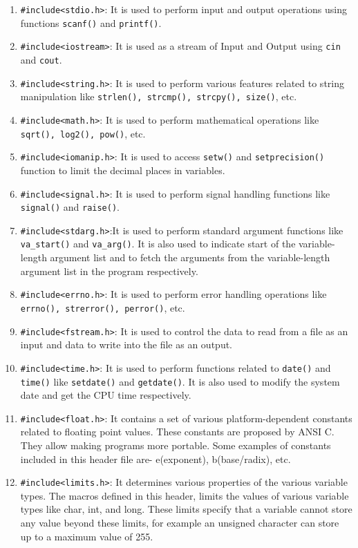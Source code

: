 \documentclass{book}
\begin{document}
\begin{enumerate}
	\item \texttt{#include<stdio.h>}: It is used to perform input and output operations using functions \texttt{scanf()} and \texttt{printf()}.
\item \texttt{#include<iostream>}: It is used as a stream of Input and Output using \texttt{cin} and \texttt{cout}.
\item \texttt{#include<string.h>}: It is used to perform various features related to string manipulation like \texttt{strlen(), strcmp(), strcpy(), size()}, etc.
\item \texttt{#include<math.h>}: It is used to perform mathematical operations like \texttt{sqrt(), log2(), pow()}, etc.
\item \texttt{#include<iomanip.h>}: It is used to access \texttt{setw()} and \texttt{setprecision()} function to limit the decimal places in variables.
\item \texttt{#include<signal.h>}: It is used to perform signal handling functions like \texttt{signal()} and \texttt{raise()}.
\item \texttt{#include<stdarg.h>}:It is used to perform standard argument functions like \texttt{va\_start()} and \texttt{va\_arg()}. It is also used to indicate start of the variable-length argument list and to fetch the arguments from the variable-length argument list in the program respectively.
\item \texttt{#include<errno.h>}: It is used to perform error handling operations like \texttt{errno(), strerror(), perror()}, etc.
\item \texttt{#include<fstream.h>}: It is used to control the data to read from a file as an input and data to write into the file as an output.
\item \texttt{#include<time.h>}: It is used to perform functions related to \texttt{date()} and \texttt{time()} like \texttt{setdate()} and \texttt{getdate()}. It is also used to modify the system date and get the CPU time respectively.
\item \texttt{#include<float.h>}: It contains a set of various platform-dependent constants related to floating point values. These constants are proposed by ANSI C. They allow making programs more portable. Some examples of constants included in this header file are- e(exponent), b(base/radix), etc.
\item \texttt{#include<limits.h>}: It determines various properties of the various variable types. The macros defined in this header, limits the values of various variable types like char, int, and long. These limits specify that a variable cannot store any value beyond these limits, for example an unsigned character can store up to a maximum value of 255.
\end{enumerate}
\end{document}
